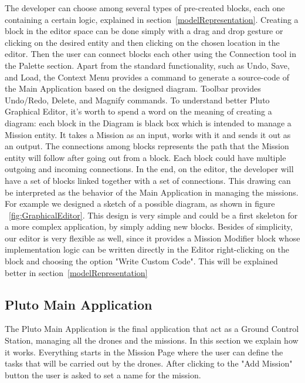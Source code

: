 The developer can choose among several types of pre-created blocks, each one containing a certain logic, explained in section~\ref{modelRepresentation}. Creating a block in the editor space can be done simply with a drag and drop gesture or clicking on the desired entity and then clicking on the chosen location in the editor. Then the user can connect blocks each other using the Connection tool in the Palette section.
Apart from the standard functionality, such as Undo, Save, and Load, the Context Menu provides a command to generate a source-code of the Main Application based on the designed diagram. Toolbar provides Undo/Redo, Delete, and Magnify commands.
To understand better Pluto Graphical Editor, it's worth to spend a word on the meaning of creating a diagram: each block in the Diagram is black box which is intended to manage a Mission entity. It takes a Mission as an input, works with it and sends it out as an output. The connections among blocks represents the path that the Mission entity will follow after going out from a block. Each block could have multiple outgoing and incoming connections.
In the end, on the editor, the developer will have a set of blocks linked together with a set of connections. This drawing can be interpreted as the behavior of the Main Application in managing the missions. For example we designed a sketch of a possible diagram, as shown in figure ~\ref{fig:GraphicalEditor}. This design is very simple and could be a first skeleton for a more complex application, by simply adding new blocks.
Besides of simplicity, our editor is very flexible as well, since it provides a Mission Modifier block whose implementation logic can be written directly in the Editor right-clicking on the block and choosing the option "Write Custom Code". This will be explained better in section~\ref{modelRepresentation}

\subsection{Pluto Main Application}
\label{plutoMainApp}

The Pluto Main Application is the final application that act as a Ground Control Station, managing all the drones and the missions. In this section we explain how it works.
Everything starts in the Mission Page where the user can define the tasks that will be carried out by the drones. After clicking to the "Add Mission" button the user is asked to set a name for the mission.

